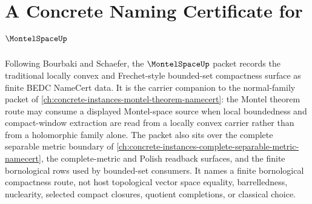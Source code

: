 \chapter{A Concrete Naming Certificate for $\MontelSpaceUp$}
\label{ch:concrete-instances-montelspace-namecert}

Following Bourbaki and Schaefer, the $\MontelSpaceUp$ packet records the traditional locally convex and Frechet-style bounded-set compactness surface as finite BEDC NameCert data. It is the carrier companion to the normal-family packet of \autoref{ch:concrete-instances-montel-theorem-namecert}: the Montel theorem route may consume a displayed Montel-space source when local boundedness and compact-window extraction are read from a locally convex carrier rather than from a holomorphic family alone. The packet also sits over the complete separable metric boundary of \autoref{ch:concrete-instances-complete-separable-metric-namecert}, the complete-metric and Polish readback surfaces, and the finite bornological rows used by bounded-set consumers. It names a finite bornological compactness route, not host topological vector space equality, barrelledness, nuclearity, selected compact closures, quotient completions, or classical choice.

